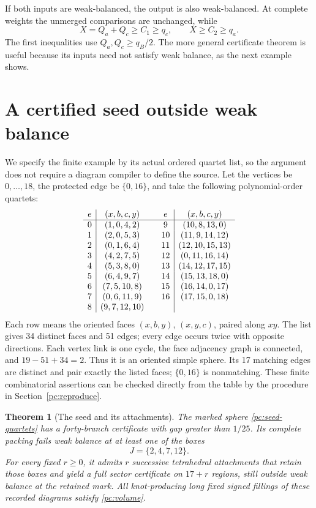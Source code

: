 \documentclass[11pt]{article}
\numberwithin{equation}{section}
\newtheorem{theorem}{Theorem}[section]
\theoremstyle{definition}\newtheorem{definition}[theorem]{Definition}
\theoremstyle{remark}\newtheorem{remark}[theorem]{Remark}
\begin{document}
If both inputs are weak-balanced, the output is also weak-balanced.
At complete weights the unmerged comparisons are unchanged, while
\[
 X=Q_a+Q_c\ge C_1\ge q_c,\qquad
 X\ge C_2\ge q_a.
\]
The first inequalities use \(Q_a,Q_c\ge q_B/2\).
The more general certificate theorem is useful because its inputs
need not satisfy weak balance, as the next example shows.

\section{A certified seed outside weak balance}\label{pc:example}

We specify the finite example by its actual ordered quartet list,
so the argument does not require a diagram compiler to define the
source. Let the vertices be \(0,\ldots,18\), the protected edge be
\(\{0,16\}\), and take the following polynomial-order quartets:
\begin{equation}\label{pc:seed-quartets}
\begin{array}{c|c@{\qquad}c|c}
e&(x,b,c,y)&e&(x,b,c,y)\\ \hline
0&(1,0,4,2)&9&(10,8,13,0)\\
1&(2,0,5,3)&10&(11,9,14,12)\\
2&(0,1,6,4)&11&(12,10,15,13)\\
3&(4,2,7,5)&12&(0,11,16,14)\\
4&(5,3,8,0)&13&(14,12,17,15)\\
5&(6,4,9,7)&14&(15,13,18,0)\\
6&(7,5,10,8)&15&(16,14,0,17)\\
7&(0,6,11,9)&16&(17,15,0,18)\\
8&(9,7,12,10)&&
\end{array}
\end{equation}
Each row means the oriented faces \((x,b,y)\), \((x,y,c)\),
paired along \(xy\). The list gives 34 distinct faces and 51 edges;
every edge occurs twice with opposite directions. Each vertex link
is one cycle, the face adjacency graph is connected, and
\(19-51+34=2\). Thus it is an oriented simple sphere.
Its 17 matching edges are distinct and pair exactly the listed
faces; \(\{0,16\}\) is nonmatching. These finite combinatorial
assertions can be checked directly from the table by the procedure
in Section~\ref{pc:reproduce}.

\begin{theorem}[The seed and its attachments]\label{pc:seed}
The marked sphere \eqref{pc:seed-quartets} has a forty-branch certificate with gap greater than \(1/25\).
Its complete packing fails weak balance at at least one of
the boxes
\[
                              J=\{2,4,7,12\}.
\]
For every fixed \(r\ge0\), it admits \(r\) successive tetrahedral
attachments that retain those boxes and yield a full sector
certificate on \(17+r\) regions, still outside weak balance at the
retained mark. All knot-producing long fixed signed fillings of
these recorded diagrams satisfy \eqref{pc:volume}.
\end{theorem}
\end{document}
